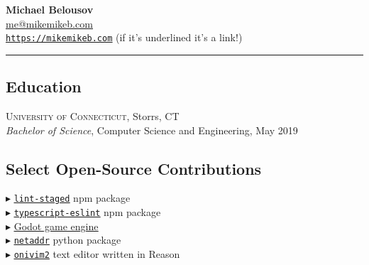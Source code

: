 \documentclass[Letterpaper,11pt]{article}
\newcommand\bul{$\blacktriangleright$ }
\newcommand\link[2]{\href{#1}{\underline{#2}}}
\begin{document}
\setlength{\parindent}{0em}
\setlength{\parskip}{1em}
\setlength{\parsep}{1em}
\setlength{\itemsep}{0.2em}
\setlength{\headsep}{0.2em}
\setlength{\topskip}{0.2em}
\setlength{\topmargin}{0.2em}
\setlength{\topsep}{0.2em}
\setlength{\partopsep}{0.2em}
\setlength{\columnsep}{1em}

\addtolength{\topmargin}{-4em}

\textbf{\Large Michael Belousov}\\
\link{mailto:mikemikeb@protonmail.com}{me@mikemikeb.com}\\
\link{https://mikemikeb.com}{\texttt{https://mikemikeb.com}} (if it's underlined it's a link!)
\vspace{0.5em} %
\hrule
\vspace{0.5em} %

\begin{multicols}{2}

    \section*{Education}
        \textsc{University of Connecticut}, Storrs, CT\\
        \textit{Bachelor of Science}, Computer Science and Engineering, May 2019\\

    \subsection*{Select Open-Source Contributions}
        \bul \link{https://github.com/okonet/lint-staged}{\texttt{lint-staged}} npm package
        \\
        \bul \link{https://github.com/typescript-eslint/typescript-eslint}{\texttt{typescript-eslint}} npm package
        \\
        \bul \link{https://github.com/godotengine/godot}{Godot game engine}
        \\
        \bul \link{https://github.com/netaddr/netaddr}{\texttt{netaddr}} python package
        \\
        \bul \link{https://github.com/onivim/oni2/pull/2630}{\texttt{onivim2}} text editor written in Reason



\end{multicols}
\end{document}
